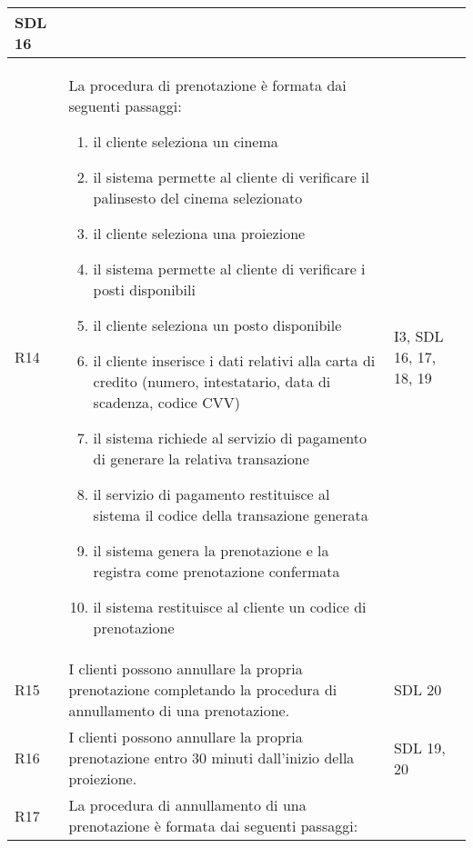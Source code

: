 \begin{longtable}{|p{0.8cm}|p{13.4cm}|p{2.1cm}|}
      SDL 16
      \\\hline
      R14                                                                     &
      La procedura di prenotazione è formata dai seguenti passaggi:
      \begin{enumerate}
            \item il cliente seleziona un cinema
            \item il sistema permette al cliente di verificare
                  il palinsesto del cinema selezionato
            \item il cliente seleziona una proiezione
            \item il sistema permette al cliente di verificare
                  i posti disponibili
            \item il cliente seleziona un posto disponibile
            \item il cliente inserisce i dati relativi alla carta
                  di credito (numero, intestatario, data di scadenza,
                  codice CVV)
            \item il sistema richiede al servizio di pagamento di
                  generare la relativa transazione
            \item il servizio di pagamento restituisce al sistema
                  il codice della transazione generata
            \item il sistema genera la prenotazione e la registra
                  come prenotazione confermata
            \item il sistema restituisce al cliente un codice di
                  prenotazione
      \end{enumerate}                   &
      I3, SDL 16, 17, 18, 19
      \\\hline
      R15                                                                     &
      I clienti possono annullare la propria prenotazione completando la
      procedura di annullamento di una prenotazione.                          &
      SDL 20
      \\\hline
      R16                                                                     &
      I clienti possono annullare la propria prenotazione entro 30 minuti
      dall'inizio della proiezione.                                           &
      SDL 19, 20
      \\\hline
      R17                                                                     &
      La procedura di annullamento di una prenotazione è formata dai
      seguenti passaggi:

\end{longtable}
